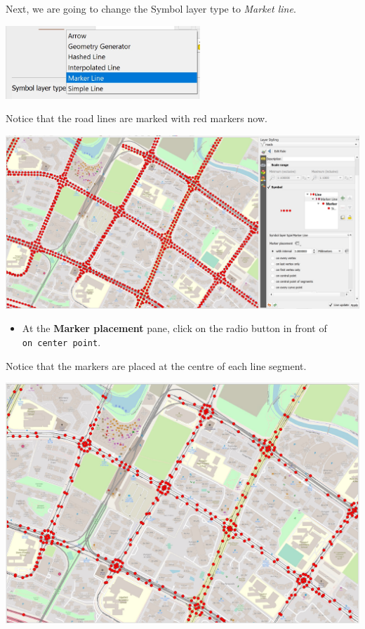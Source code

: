 \documentclass[
  letterpaper,
  DIV=11,
  numbers=noendperiod]{scrreprt}
\providecommand{\tightlist}{%
  \setlength{\itemsep}{0pt}\setlength{\parskip}{0pt}}\usepackage{longtable,booktabs,array}
\begin{document}
Next, we are going to change the Symbol layer type to \emph{Market
line}.

\includegraphics[width=0.55\textwidth,height=\textheight]{./img09/image15.jpg}

Notice that the road lines are marked with red markers now.

\includegraphics{./img09/image16.jpg}

\begin{itemize}
\tightlist
\item
  At the \textbf{Marker placement} pane, click on the radio button in
  front of \texttt{on\ center\ point}.
\end{itemize}

Notice that the markers are placed at the centre of each line segment.

\includegraphics{./img09/image18.jpg}
\end{document}
